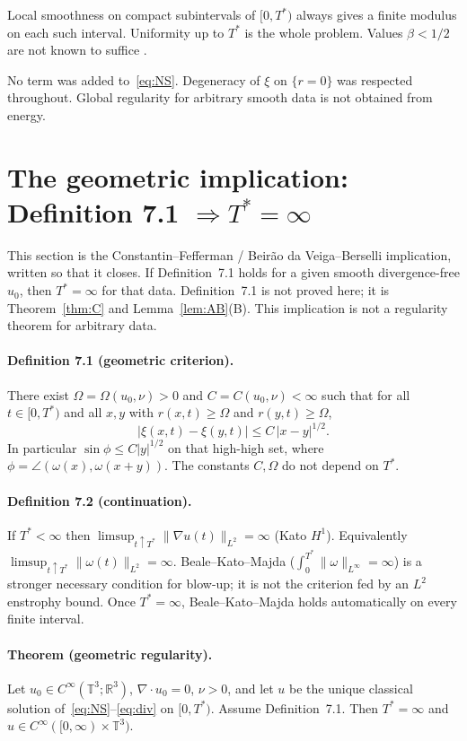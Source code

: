 \documentclass[11pt,a4paper]{article}
\theoremstyle{definition}
\theoremstyle{remark}
\newcommand{\R}{\mathbb{R}}
\newcommand{\T}{\mathbb{T}}
\newcommand{\abs}[1]{\lvert#1\rvert}
\newcommand{\norm}[1]{\lVert#1\rVert}
\begin{document}
Local smoothness on compact subintervals of \([0,T^*)\) always gives a
finite modulus on each such interval. Uniformity up to \(T^*\) is the
whole problem. Values \(\beta<1/2\) are not known to suffice
\cite{BdV2016}.

No term was added to~\eqref{eq:NS}. Degeneracy of \(\xi\) on \(\{r=0\}\)
was respected throughout. Global regularity for arbitrary smooth data
is not obtained from energy.

\section{The geometric implication: Definition 7.1 \(\Rightarrow T^*=\infty\)}
\label{sec:implication}

This section is the Constantin--Fefferman / Beir\~ao da Veiga--Berselli
implication, written so that it closes. If Definition~7.1 holds for a
given smooth divergence-free \(u_0\), then \(T^*=\infty\) for that data.
Definition~7.1 is not proved here; it is Theorem~\ref{thm:C} and
Lemma~\ref{lem:AB}(B). This implication is not a regularity theorem for
arbitrary data.

\paragraph{Definition 7.1 (geometric criterion).}
There exist \(\Omega=\Omega(u_0,\nu)>0\) and \(C=C(u_0,\nu)<\infty\)
such that for all \(t\in[0,T^*)\) and all \(x,y\) with
\(r(x,t)\ge\Omega\) and \(r(y,t)\ge\Omega\),
\[
\abs{\xi(x,t)-\xi(y,t)}\le C\,\abs{x-y}^{1/2}.
\]
In particular \(\sin\phi\le C\abs{y}^{1/2}\) on that high-high set,
where \(\phi=\angle(\omega(x),\omega(x+y))\). The constants \(C,\Omega\)
do not depend on \(T^*\).

\paragraph{Definition 7.2 (continuation).}
If \(T^*<\infty\) then
\(\limsup_{t\uparrow T^*}\norm{\nabla u(t)}_{L^2}=\infty\)
(Kato \(H^1\)). Equivalently
\(\limsup_{t\uparrow T^*}\norm{\omega(t)}_{L^2}=\infty\).
Beale--Kato--Majda (\(\int_0^{T^*}\norm{\omega}_{L^\infty}=\infty\)) is
a stronger necessary condition for blow-up; it is not the criterion
fed by an \(L^2\) enstrophy bound. Once \(T^*=\infty\), Beale--Kato--Majda
holds automatically on every finite interval.

\paragraph{Theorem (geometric regularity).}
Let \(u_0\in C^\infty(\T^3;\R^3)\), \(\nabla\cdot u_0=0\), \(\nu>0\),
and let \(u\) be the unique classical solution of~\eqref{eq:NS}--\eqref{eq:div}
on \([0,T^*)\). Assume Definition~7.1. Then \(T^*=\infty\) and
\(u\in C^\infty([0,\infty)\times\T^3)\).
\end{document}
